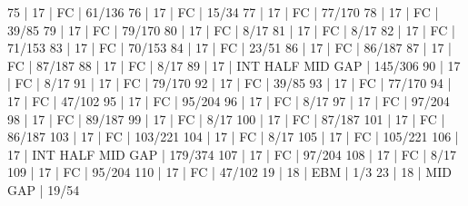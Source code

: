 75    |  17    |    FC                                        | 61/136   
76    |  17    |    FC                                        | 15/34   
77    |  17    |    FC                                        | 77/170   
78    |  17    |    FC                                        | 39/85   
79    |  17    |    FC                                        | 79/170   
80    |  17    |    FC                                        | 8/17   
81    |  17    |    FC                                        | 8/17   
82    |  17    |    FC                                        | 71/153   
83    |  17    |    FC                                        | 70/153   
84    |  17    |    FC                                        | 23/51   
86    |  17    |    FC                                        | 86/187   
87    |  17    |    FC                                        | 87/187   
88    |  17    |    FC                                        | 8/17   
89    |  17    |        INT  HALF            MID  GAP         | 145/306   
90    |  17    |    FC                                        | 8/17   
91    |  17    |    FC                                        | 79/170   
92    |  17    |    FC                                        | 39/85   
93    |  17    |    FC                                        | 77/170   
94    |  17    |    FC                                        | 47/102   
95    |  17    |    FC                                        | 95/204   
96    |  17    |    FC                                        | 8/17   
97    |  17    |    FC                                        | 97/204   
98    |  17    |    FC                                        | 89/187   
99    |  17    |    FC                                        | 8/17   
100   |  17    |    FC                                        | 87/187   
101   |  17    |    FC                                        | 86/187   
103   |  17    |    FC                                        | 103/221   
104   |  17    |    FC                                        | 8/17   
105   |  17    |    FC                                        | 105/221   
106   |  17    |        INT  HALF            MID  GAP         | 179/374   
107   |  17    |    FC                                        | 97/204   
108   |  17    |    FC                                        | 8/17   
109   |  17    |    FC                                        | 95/204   
110   |  17    |    FC                                        | 47/102   
19    |  18    |                   EBM                        | 1/3   
23    |  18    |                             MID  GAP         | 19/54   
